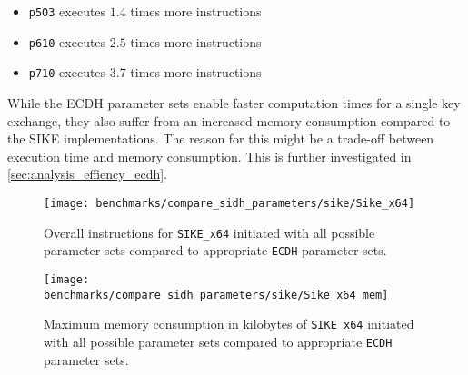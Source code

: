 \begin{itemize}
\itemsep0em 
\item \texttt{p503} executes $1.4$ times more instructions
\item \texttt{p610} executes $2.5$ times more instructions
\item \texttt{p710} executes $3.7$ times more instructions
\end{itemize}
While the \gls{ECDH} parameter sets enable faster computation times for a single key exchange, they also suffer from an increased memory consumption compared to the \gls{SIKE} implementations. The reason for this might be a trade-off between execution time and memory consumption. This is further investigated in \autoref{sec:analysis_effiency_ecdh}.

\begin{figure}[H]
  \centering
  \texttt{[image: benchmarks/compare\_sidh\_parameters/sike/Sike\_x64]}
  \caption[Instructions for all parameter sets via \texttt{SIKE\_x64}]
  {Overall instructions for \texttt{SIKE\_x64} initiated with all possible parameter sets compared to appropriate \texttt{ECDH} parameter sets.}
  \label{fig:results_all_curves_sike}
\end{figure}

\begin{figure}[H]
  \centering
  \texttt{[image: benchmarks/compare\_sidh\_parameters/sike/Sike\_x64\_mem]}
  \caption[Memory consumption for all parameter sets via \texttt{SIKE\_x64}]
  {Maximum memory consumption in kilobytes of \texttt{SIKE\_x64} initiated with all possible parameter sets compared to appropriate \texttt{ECDH} parameter sets.}
  \label{fig:results_all_curves_sike_mem}
\end{figure}

